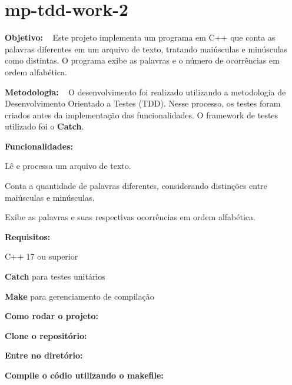 \chapter{mp-\/tdd-\/work-\/2}
\hypertarget{index}{}\label{index}
\label{index_md_README}%
%
 {\bfseries{Objetivo\+:}} ~\newline
 Este projeto implementa um programa em C++ que conta as palavras diferentes em um arquivo de texto, tratando maiúsculas e minúsculas como distintas. O programa exibe as palavras e o número de ocorrências em ordem alfabética.

{\bfseries{Metodologia\+:}} ~\newline
 O desenvolvimento foi realizado utilizando a metodologia de Desenvolvimento Orientado a Testes (TDD). Nesse processo, os testes foram criados antes da implementação das funcionalidades. O framework de testes utilizado foi o {\bfseries{Catch}}.

{\bfseries{Funcionalidades\+:}} ~\newline

\begin{DoxyItemize}
\item Lê e processa um arquivo de texto.
\item Conta a quantidade de palavras diferentes, considerando distinções entre maiúsculas e minúsculas.
\item Exibe as palavras e suas respectivas ocorrências em ordem alfabética.
\end{DoxyItemize}

{\bfseries{Requisitos\+:}}
\begin{DoxyItemize}
\item C++ 17 ou superior
\item {\bfseries{Catch}} para testes unitários
\item {\bfseries{Make}} para gerenciamento de compilação
\end{DoxyItemize}

{\bfseries{Como rodar o projeto\+:}}


\begin{DoxyEnumerate}
\item {\bfseries{Clone o repositório\+:}} 
\begin{DoxyCode}{0}

\end{DoxyCode}

\item {\bfseries{Entre no diretório\+:}} 
\begin{DoxyCode}{0}

\end{DoxyCode}

\item {\bfseries{Compile o códio utilizando o makefile\+:}} 
\begin{DoxyCode}{0}

\end{DoxyCode}
 
\end{DoxyEnumerate}